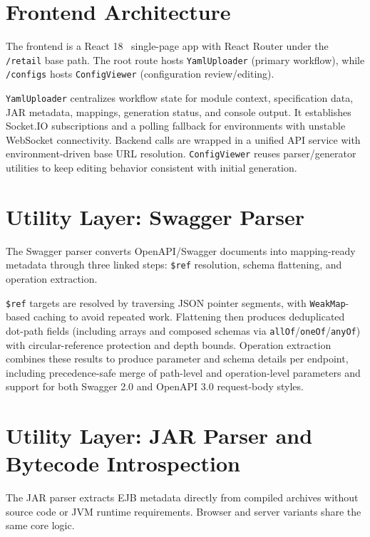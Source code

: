 \section{Frontend Architecture}

The frontend is a React 18~\cite{react_docs} single-page app with React Router under the \texttt{/retail} base path. The root route hosts \texttt{YamlUploader} (primary workflow), while \texttt{/configs} hosts \texttt{ConfigViewer} (configuration review/editing).

\texttt{YamlUploader} centralizes workflow state for module context, specification data, JAR metadata, mappings, generation status, and console output. It establishes Socket.IO subscriptions and a polling fallback for environments with unstable WebSocket connectivity. Backend calls are wrapped in a unified API service with environment-driven base URL resolution. \texttt{ConfigViewer} reuses parser/generator utilities to keep editing behavior consistent with initial generation.

\section{Utility Layer: Swagger Parser}

The Swagger parser converts OpenAPI/Swagger documents into mapping-ready metadata through three linked steps: \texttt{\$ref} resolution, schema flattening, and operation extraction.

\texttt{\$ref} targets are resolved by traversing JSON pointer segments, with \texttt{WeakMap}-based caching to avoid repeated work. Flattening then produces deduplicated dot-path fields (including arrays and composed schemas via \texttt{allOf}/\texttt{oneOf}/\texttt{anyOf}) with circular-reference protection and depth bounds. Operation extraction combines these results to produce parameter and schema details per endpoint, including precedence-safe merge of path-level and operation-level parameters and support for both Swagger 2.0 and OpenAPI 3.0 request-body styles.

\section{Utility Layer: JAR Parser and Bytecode Introspection}

The JAR parser extracts EJB metadata directly from compiled archives without source code or JVM runtime requirements. Browser and server variants share the same core logic.

